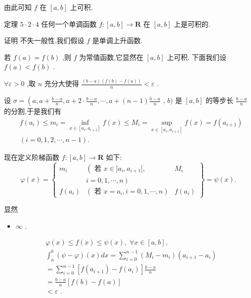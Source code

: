 由此可知 $f$ 在 $\left\lbrack  {a,b}\right\rbrack$ 上可积.

定理 $5 \cdot  2 \cdot  4$ 任何一个单调函数 $f : \left\lbrack  {a,b}\right\rbrack   \rightarrow  \mathbf{R}$ 在 $\left\lbrack  {a,b}\right\rbrack$ 上是可积的.

证明 不失一般性,我们假设 $f$ 是单调上升函数.

若 $f\left( a\right)  = f\left( b\right)$ ,则 $f$ 为常值函数,它显然在 $\left\lbrack  {a,b}\right\rbrack$ 上可积. 下面我们设 $f\left( a\right)  < f\left( b\right)$ .

$\forall \varepsilon  > 0$ ,取 $n$ 充分大使得 $\frac{\left( {b - a}\right) \left( {f\left( b\right)  - f\left( a\right) }\right) }{n} < \varepsilon$ .

设 $\sigma  = \left( {a,a + \frac{b - a}{n},a + 2 \cdot  \frac{b - a}{n},\cdots ,a + \left( {n - 1}\right) \frac{b - a}{n}}\right.$ , $b)$ 是 $\left\lbrack  {a,b}\right\rbrack$ 的等步长 $\frac{b - a}{n}$ 的分割,于是我们有
\begin{align*}
	&f\left( {a}_{i}\right)  \leq  {m}_{i} = \mathop{\inf }\limits_{{x \in  \left\lbrack  {{a}_{i},{a}_{i + 1}}\right\rbrack  }}f\left( x\right)  \leq  {M}_{i} = \mathop{\sup }\limits_{{x \in  \left\lbrack  {{a}_{i},{a}_{i + 1}}\right\rbrack  }}f\left( x\right)  = f\left( {a}_{i + 1}\right)\\
	&\left( {i = 0,1,2,\cdots ,n - 1}\right) .
\end{align*}

现在定义阶梯函数 $f : \left\lbrack  {a,b}\right\rbrack   \rightarrow  \mathbf{R}$ 如下:
$$\varphi \left( x\right)  = \left\{  \begin{matrix} {m}_{i} & \left( {\text{ 若 }x \in  \rbrack {a}_{i},{a}_{i + 1}\lbrack ,}\right. & {M}_{i} \\   & \left. {i = 0,1,\cdots ,n}\right) & \\  f\left( {a}_{i}\right) & \left( {\text{ 若 }x = {a}_{i},i = 0,1,\cdots ,n}\right) & f\left( {a}_{i}\right)  \end{matrix}\right\}   = \psi \left( x\right) .$$

显然

\begin{itemize}
	\item $\infty$ .
\end{itemize}
\begin{align*}
	&\varphi \left( x\right)  \leq  f\left( x\right)  \leq  \psi \left( x\right) ,\;\forall x \in  \left\lbrack  {a,b}\right\rbrack  ,\\
	&{\int }_{a}^{b}\left( {\psi  - \varphi }\right) \left( x\right) {dx} = \mathop{\sum }\limits_{{i = 0}}^{{n - 1}}\left( {{M}_{i} - {m}_{i}}\right) \left( {{a}_{i + 1} - {a}_{i}}\right)\\
	&= \mathop{\sum }\limits_{{i = 0}}^{{n - 1}}\left\lbrack  {f\left( {a}_{i + 1}\right)  - f\left( {a}_{i}\right) }\right\rbrack  \frac{b - a}{n}\\
	&= \frac{b - a}{n}\left\lbrack  {f\left( b\right)  - f\left( a\right) }\right\rbrack\\
	&< \varepsilon \text{ . }
\end{align*}

